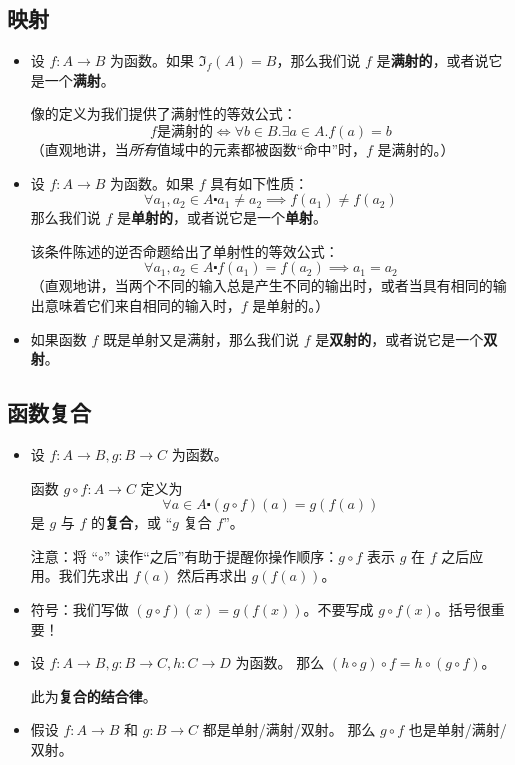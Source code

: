 \subsection{映射}

\begin{itemize}
    \item 设 $f : A \to B$ 为函数。如果 $\Im_f (A) = B$，那么我们说 $f$ 是\textbf{满射的}，或者说它是一个\textbf{满射}。

          像的定义为我们提供了满射性的等效公式：
          \[f \text{是满射的} \iff \forall b \in B. \exists a \in A. f(a) = b\]
          （直观地讲，当\emph{所有}值域中的元素都被函数``命中''时，$f$ 是满射的。）
    \item 设 $f : A \to B$ 为函数。如果 $f$ 具有如下性质：
          \[\forall a_1, a_2 \in A \centerdot a_1 \ne a_2 \implies f(a_1) \ne f(a_2)\]
          那么我们说 $f$ 是\textbf{单射的}，或者说它是一个\textbf{单射}。

          该条件陈述的逆否命题给出了单射性的等效公式：
          \[\forall a_1, a_2 \in A \centerdot f(a_1) = f(a_2) \implies a_1 = a_2\]
          （直观地讲，当两个不同的输入总是产生不同的输出时，或者当具有相同的输出意味着它们来自相同的输入时，$f$ 是单射的。）
    \item 如果函数 $f$ 既是单射又是满射，那么我们说 $f$ 是\textbf{双射的}，或者说它是一个\textbf{双射}。
\end{itemize}

\subsection{函数复合}

\begin{itemize}
    \item 设 $f: A \to B , g: B \to C$ 为函数。

          函数 $g \circ f : A \to C$ 定义为
          \[\forall a \in A \centerdot (g \circ f)(a) = g(f(a))\]
          是 $g$ 与 $f$ 的\textbf{复合}，或 ``$g$ 复合 $f$''。

          注意：将 ``$\circ$'' 读作``之后''有助于提醒你操作顺序：$g \circ f$ 表示 $g$ 在 $f$ 之后应用。我们先求出 $f(a)$ 然后再求出 $g(f(a))$。
    \item 符号：我们写做 $(g \circ f)(x) = g(f(x))$。不要写成 $g \circ f(x)$。括号很重要！
    \item 设 $f : A \to B , g : B \to C , h : C \to D$ 为函数。 那么 $(h \circ g) \circ f = h \circ (g \circ f)$。

          此为\textbf{复合的结合律}。
    \item 假设 $f : A \to B$ 和 $g : B \to C$ 都是单射/满射/双射。 那么 $g \circ f$ 也是单射/满射/双射。

\end{itemize}

